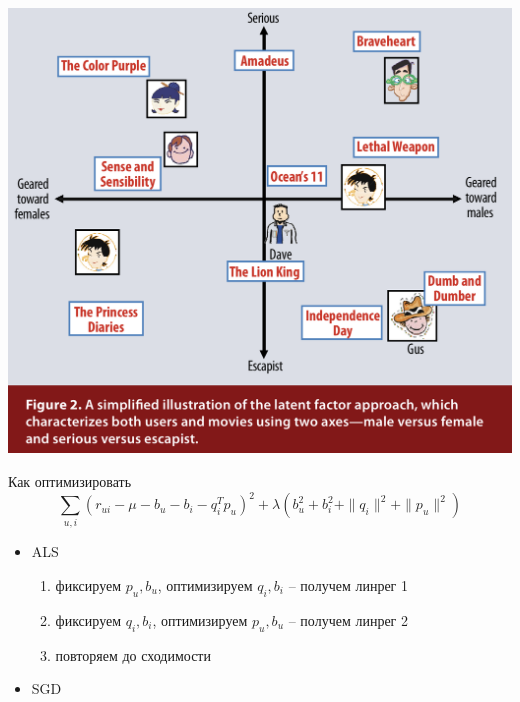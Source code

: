 \documentclass[11pt,aspectratio=169,handout=true]{beamer}
\begin{document}
\begin{frame}
\begin{center}
\includegraphics[scale=0.3]{images/latent.png}
\end{center}
\end{frame}

\begin{frame}{Как оптимизировать}
\[
\sum_{u, i} (r_{ui} - \mu - b_u - b_i - q_i^T p_u)^2 + \lambda (b_u^2 +  b_i^2 + \| q_i \|^2 + \| p_u \|^2)
\]

\begin{itemize}
\item ALS \cite{IMPLICIT}
\begin{enumerate}
\item фиксируем $p_u, b_u$, оптимизируем $q_i, b_i$ -- получем линрег 1
\item фиксируем  $q_i, b_i$, оптимизируем $p_u, b_u$ -- получем линрег 2
\item повторяем до сходимости
\end{enumerate}
\item SGD
\end{itemize}

\end{frame}
\end{document}
